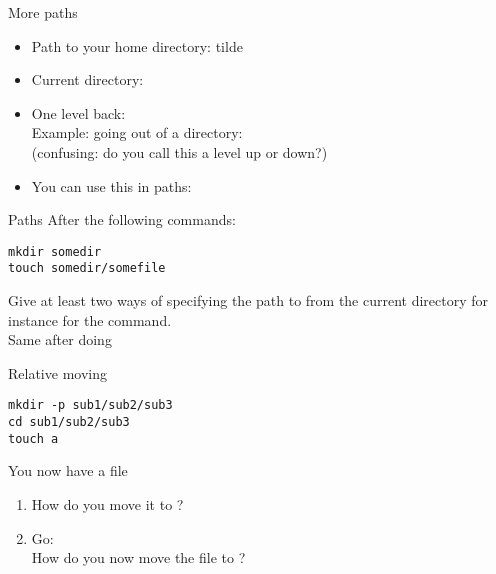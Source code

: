 \documentclass[11pt,headernav]{beamer}
\begin{document}

\begin{numberedframe}{More paths}
  \label{sl-lnx:morepath}
  \begin{itemize}
  \item Path to your home directory: tilde
  \item Current directory:~
  \item One level back:~\\
    Example: going out of a directory:~\\
    (confusing: do you call this a level up or down?)
  \item You can use this in paths: 
  \end{itemize}
\end{numberedframe}



\begin{exercise}{Paths}
  After the following commands:
\begin{verbatim}
mkdir somedir
touch somedir/somefile
\end{verbatim}
Give at least two ways of specifying the path to 
from the current directory
for instance for the  command.\\
Same after doing 
\end{exercise}

\begin{exercise}{Relative moving}
\begin{verbatim}
mkdir -p sub1/sub2/sub3
cd sub1/sub2/sub3
touch a
\end{verbatim}
You now have a file \\
\begin{enumerate}
\item
  How do you move it to ?
\item Go: \\
  How do you now move the file to ?
\end{enumerate}
\end{exercise}
\end{document}
